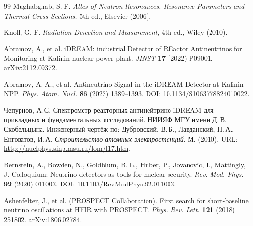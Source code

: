 \documentclass[a4paper,12pt]{extarticle}
\begin{document}
\begin{thebibliography}{99}
 Mughabghab, S. F. \textit{Atlas of Neutron Resonances. Resonance Parameters and Thermal Cross Sections.} 5th ed., Elsevier (2006).

 Knoll, G. F. \textit{Radiation Detection and Measurement}, 4th ed., Wiley (2010).

 Abramov, A., et al. iDREAM: industrial Detector of REactor Antineutrinos for Monitoring at Kalinin nuclear power plant. \textit{JINST} \textbf{17} (2022) P09001. arXiv:2112.09372.

 Abramov, A. A., et al. Antineutrino Signal in the iDREAM Detector at Kalinin NPP. \textit{Phys. Atom. Nucl.} \textbf{86} (2023) 1389--1393. DOI: 10.1134/S1063778824010022.

 Чепурнов, А.\,С. Спектрометр реакторных антинейтрино iDREAM для прикладных и фундаментальных исследований. НИИЯФ МГУ имени Д.\,В. Скобельцына. Инженерный чертёж по: Дубровский, В.\,Б., Лавданский, П.\,А., Енговатов, И.\,А. \textit{Строительство атомных электростанций}. М. (2010). URL: \url{http://nuclphys.sinp.msu.ru/lom/l17.htm}.

 Bernstein, A., Bowden, N., Goldblum, B. L., Huber, P., Jovanovic, I., Mattingly, J. Colloquium: Neutrino detectors as tools for nuclear security. \textit{Rev. Mod. Phys.} \textbf{92} (2020) 011003. DOI: 10.1103/RevModPhys.92.011003.

 Ashenfelter, J., et al. (PROSPECT Collaboration). First search for short-baseline neutrino oscillations at HFIR with PROSPECT. \textit{Phys. Rev. Lett.} \textbf{121} (2018) 251802. arXiv:1806.02784.

\end{thebibliography}
\end{document}
